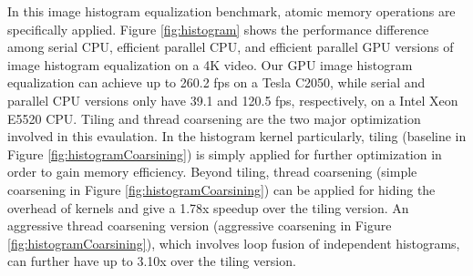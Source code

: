 In this image histogram equalization benchmark, atomic memory operations are specifically applied. 
Figure \ref{fig:histogram} shows the performance difference among serial CPU, efficient parallel CPU, and efficient parallel GPU versions of image histogram equalization on a 4K video.
Our GPU image histogram equalization can achieve up to 260.2 fps on a Tesla C2050, while serial and parallel CPU versions only have 39.1 and 120.5 fps, respectively, on a Intel Xeon E5520 CPU.
Tiling and thread coarsening are the two major optimization involved in this evaulation.
In the histogram kernel particularly, tiling (baseline in Figure \ref{fig:histogramCoarsining}) is simply applied for further optimization in order to gain memory efficiency.
Beyond tiling, thread coarsening (simple coarsening in Figure \ref{fig:histogramCoarsining}) can be applied for hiding the overhead of kernels and give a 1.78x speedup over the tiling version.
An aggressive thread coarsening version (aggressive coarsening in Figure \ref{fig:histogramCoarsining}), which involves loop fusion of independent histograms, can further have up to 3.10x over the tiling version.


